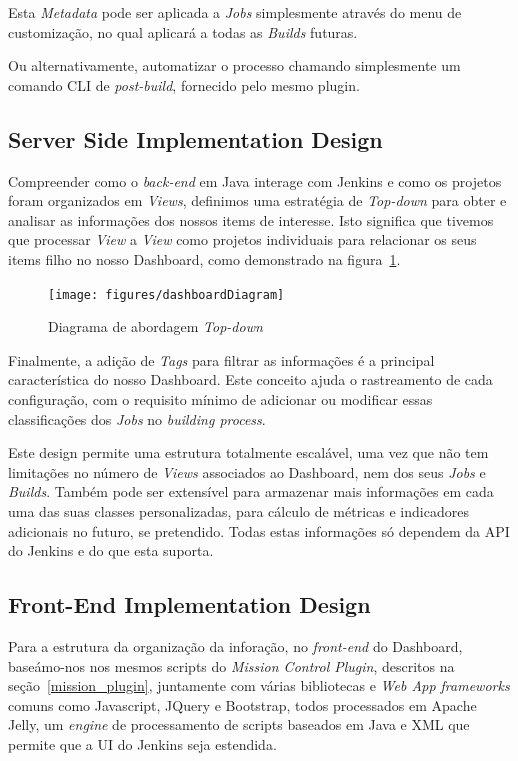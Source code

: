 \documentclass[9pt,a4paper]{extarticle}
\begin{document}
\begin{multicols}{2}
Esta \textit{Metadata} pode ser aplicada a \textit{Jobs} simplesmente através do menu de customização, no qual aplicará a todas as \textit{Builds} futuras.

Ou alternativamente, automatizar o processo chamando simplesmente um comando CLI de \textit{post-build}, fornecido pelo mesmo plugin.

\subsection{Server Side Implementation Design}\label{sc:implementationDesign}

Compreender como o \textit{back-end} em Java interage com Jenkins e como os projetos foram organizados em \textit{Views}, definimos uma estratégia de \textit{Top-down} para obter e analisar as informações dos nossos items de interesse.
Isto significa que tivemos que processar \textit{View} a \textit{View} como projetos individuais para relacionar os seus items filho no nosso Dashboard, como demonstrado na figura~\ref{fig:dashboardDiagram}.

\begin{figure}[H]
\centerline{\texttt{[image: figures/dashboardDiagram]}}
\caption{Diagrama de abordagem \textit{Top-down}}  
\label{fig:dashboardDiagram}
\end{figure}

Finalmente, a adição de \textit{Tags} para filtrar as informações é a principal característica do nosso Dashboard. Este conceito ajuda o rastreamento de cada configuração, com o requisito mínimo de adicionar ou modificar essas classificações dos \textit{Jobs} no \textit{building process}.

Este design permite uma estrutura totalmente escalável, uma vez que não tem limitações no número de \textit{Views} associados ao Dashboard, nem dos seus \textit{Jobs} e \textit{Builds}. Também pode ser extensível para armazenar mais informações em cada uma das suas classes personalizadas, para cálculo de métricas e indicadores adicionais no futuro, se pretendido. Todas estas informações só dependem da API do Jenkins e do que esta suporta.

\subsection{Front-End Implementation Design}\label{sc:frontend}

Para a estrutura da organização da inforação, no \textit{front-end} do Dashboard, baseámo-nos nos mesmos scripts do \textit{ Mission Control Plugin}, descritos na seção~\ref{mission_plugin}, juntamente com várias bibliotecas e \textit{Web App frameworks} comuns como Javascript, JQuery e Bootstrap, todos processados em Apache Jelly, um \textit{engine} de processamento de scripts baseados em Java e XML que permite que a UI do Jenkins seja estendida.


\end{multicols}
\end{document}
